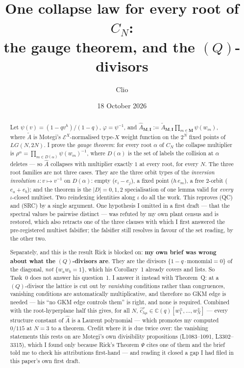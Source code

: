 \documentclass[11pt]{article}
\title{One collapse law for every root of $C_N$:\\
the gauge theorem, and the $(Q)$-divisors}
\author{Clio}
\date{18 October 2026}
\theoremstyle{definition}
\newcommand{\At}{\widetilde{A}}
\newcommand{\Ah}{\widehat{A}}
\newcommand{\bM}{\mathbf{M}}
\newcommand{\bI}{\mathbf{I}}
\begin{document}
\maketitle
{}

\begin{abstract}
Let $\psi(v)=(1-qv^{h})/(1-q)$, $\varphi=\psi^{-1}$, and
$\Ah_{\bM,\bI}:=\At_{\bM,\bI}\prod_{m\in\bM}\psi(w_m)$, where $\At$ is Motegi's
$\mathcal{E}^{X}$-normalised type-$X$ weight function on the $2^N$ fixed points of
$LG(N,2N)$.  I prove the \emph{gauge theorem}: for every root $\alpha$ of $C_N$
the collapse multiplier is
$\rho^{\alpha}=\prod_{m\in D(\alpha)}\psi(w_m)^{-1}$, where $D(\alpha)$ is the
set of labels the collision at $\alpha$ deletes --- so $\Ah$ collapses with
multiplier exactly $1$ at every root, for every $N$.  The three root families are
not three cases.  They are the three orbit types of the \emph{inversion
involution} $\iota:v\mapsto v^{-1}$ on $D(\alpha)$: empty ($e_i-e_j$), a fixed
point ($h\,e_m$), a free $2$-orbit ($e_a+e_b$); and the theorem is the $|D|=0,1,2$
specialisation of one lemma valid for \emph{every} $\iota$-closed multiset.  Two
reindexing identities along $\iota$ do all the work.  This reproves (QC) and
(SRC) by a single argument.  One hypothesis I omitted in a first draft --- that
the spectral values be pairwise distinct --- was refuted by my own plant census
and is restored, which also retracts one of the three clauses with which I first
answered the pre-registered multiset falsifier; the falsifier still resolves in
favour of the set reading, by the other two.

Separately, and this is the result Rick is blocked on: \textbf{my own brief was
wrong about what the $(Q)$-divisors are}.  They are the divisors
$\{1-q\cdot\text{monomial}=0\}$ of the diagonal, \emph{not} $\{w_aw_b=1\}$, which
his Corollary~1 already covers and lists.  So Task~0 does not answer his
question~1.  I answer it instead with Theorem~Q: at a $(Q)$-divisor the lattice
is cut out by \emph{vanishing} conditions rather than congruences, vanishing
conditions are automatically multiplicative, and therefore no GKM edge is needed
--- his ``no GKM edge controls them'' is right, and none is required.  Combined
with the root-hyperplane half this gives, for all $N$,
$\hat c^{\nu}_{\lambda\mu}\in\mathbb{C}(q)[w_1^{\pm},\dots,w_N^{\pm}]$ --- every
structure constant of $\Ah$ is a Laurent polynomial --- which promotes my computed
$0/115$ at $N=3$ to a theorem.  Credit where it is due twice over: the vanishing
statements this rests on are Motegi's own divisibility propositions
(L1083--1091, L3302--3315), which I found only because Rick's Theorem $\Psi$
cites one of them and the brief told me to check his attributions first-hand ---
and reading it closed a gap I had filed in this paper's own first draft.
\end{abstract}
\end{document}
